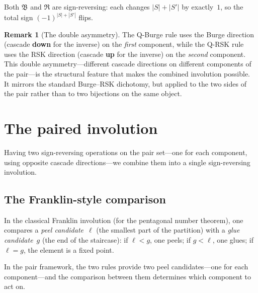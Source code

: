 \documentclass[11pt]{article}
\theoremstyle{plain}
\theoremstyle{definition}
\newtheorem{remark}[theorem]{Remark}
\begin{document}
Both $\mathfrak{B}$ and $\mathfrak{R}$ are sign-reversing: each
changes $|S| + |S'|$ by exactly~$1$, so the total sign
$(-1)^{|S|+|S'|}$ flips.

\begin{remark}[The double asymmetry]
\label{rem:double-asymmetry}
The Q-Burge rule uses the Burge direction (cascade
\textbf{down} for the inverse) on the \emph{first} component,
while the Q-RSK rule uses the RSK direction (cascade
\textbf{up} for the inverse) on the \emph{second} component.
This double asymmetry---different cascade directions on
different components of the pair---is the structural feature
that makes the combined involution possible.  It mirrors the
standard Burge--RSK dichotomy, but applied to the two sides of
the pair rather than to two bijections on the same object.
\end{remark}


\section{The paired involution}
\label{sec:paired-involution}

Having two sign-reversing operations on the pair set---one for
each component, using opposite cascade directions---we combine
them into a single sign-reversing involution.


\subsection{The Franklin-style comparison}

In the classical Franklin involution (for the pentagonal number
theorem), one compares a \emph{peel candidate}~$\ell$ (the
smallest part of the partition) with a \emph{glue
candidate}~$g$ (the end of the staircase): if $\ell < g$, one
peels; if $g < \ell$, one glues; if $\ell = g$, the element
is a fixed point.

In the pair framework, the two rules provide two peel
candidates---one for each component---and the comparison
between them determines which component to act on.
\end{document}
